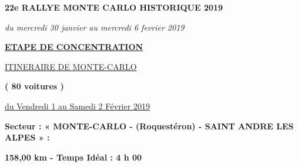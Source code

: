 \documentclass{article}%
\begin{document}
%
\normalsize%
\begin{center} \textbf{\LARGE{22e RALLYE MONTE CARLO HISTORIQUE 2019}} \end{center}%
\begin{center} \textit{du mercredi 30 janvier au mercredi 6 fevrier 2019} \end{center}%
\begin{center} \textbf{\underline{ETAPE DE CONCENTRATION}} \end{center}%
\begin{center} \underline{ITINERAIRE DE MONTE-CARLO} \end{center}%
\begin{center} \textbf{( 80 voitures )} \end{center}%
\begin{flushright} \underline{du Vendredi 1 au Samedi 2 Février 2019} \end{flushright}%
\begin{flushleft} \textbf{Secteur : « MONTE-CARLO - (Roquestéron) - SAINT ANDRE LES ALPES » :
} \end{flushleft}%
\begin{flushright} \textbf{158,00 km - Temps Idéal : 4 h 00
} \end{flushright}%
\end{document}
